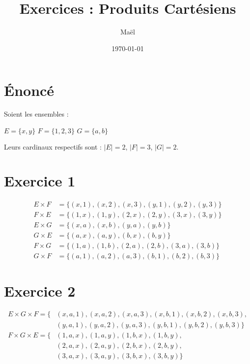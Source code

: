 \documentclass[12pt,a4paper]{article}
\title{\textbf{Exercices : Produits Cartésiens}}
\author{Maël}
\date{\today}
\begin{document}
\maketitle

\section*{Énoncé}
Soient les ensembles :
\begin{center}
    $E = \{x, y\}$ \quad $F = \{1, 2, 3\}$ \quad $G = \{a, b\}$
\end{center}
Leurs cardinaux respectifs sont : $|E| = 2$, $|F| = 3$, $|G| = 2$.

\section*{Exercice 1}
\begin{align*}
    E \times F &= \{(x, 1), (x, 2), (x, 3), (y, 1), (y, 2), (y, 3)\} \\
    F \times E &= \{(1, x), (1, y), (2, x), (2, y), (3, x), (3, y)\} \\
    E \times G &= \{(x, a), (x, b), (y, a), (y, b)\} \\
    G \times E &= \{(a, x), (a, y), (b, x), (b, y)\} \\
    F \times G &= \{(1, a), (1, b), (2, a), (2, b), (3, a), (3, b)\} \\
    G \times F &= \{(a, 1), (a, 2), (a, 3), (b, 1), (b, 2), (b, 3)\}
\end{align*}

\section*{Exercice 2}
\begin{align*}
    E \times G \times F = \{ &(x, a, 1), (x, a, 2), (x, a, 3), (x, b, 1), (x, b, 2), (x, b, 3), \\
                             &(y, a, 1), (y, a, 2), (y, a, 3), (y, b, 1), (y, b, 2), (y, b, 3) \} \\[10pt]
    F \times G \times E = \{ &(1, a, x), (1, a, y), (1, b, x), (1, b, y), \\
                             &(2, a, x), (2, a, y), (2, b, x), (2, b, y), \\
                             &(3, a, x), (3, a, y), (3, b, x), (3, b, y) \}
\end{align*}
\end{document}
